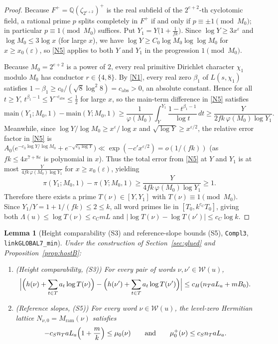 \documentclass[11pt]{amsart}
\newcommand{\Q}{\mathbb{Q}}
\newcommand{\eps}{\varepsilon}
\theoremstyle{plain}
\newtheorem{lemma}[theorem]{Lemma}
\theoremstyle{definition}
\numberwithin{equation}{section}
\begin{document}
\begin{proof}
Because $F^+=\Q(\zeta_{2^{e+2}})^+$ is the real subfield of the $2^{e+2}$-th cyclotomic field,
a rational prime $p$ splits completely in $F^+$ if and only if $p\equiv\pm 1\pmod{M_0}$; in
particular $p\equiv 1\pmod{M_0}$ suffices. Put $Y_1=Y\bigl(1+\frac{1}{fk}\bigr)$. Since
$\log Y\ge 3x^\eps$ and $\log M_0\le 3\log x$ (for large $x$), we have
$\log Y\ge C_0\log M_0\log\log M_0$ for $x\ge x_0(\eps)$, so \ref{N5} applies to both $Y$ and
$Y_1$ in the progression $1\pmod{M_0}$.

Because $M_0=2^{e+2}$ is a power of $2$, every real primitive Dirichlet character $\chi_1$
modulo $M_0$ has conductor $r\in\{4,8\}$. By \ref{N1}, every real zero $\beta_1$ of
$L(s,\chi_1)$ satisfies $1-\beta_1\ge c_0/(\sqrt{8}\log^2 8)=c_{\mathrm{abs}}>0$, an absolute
constant. Hence for all $t\ge Y$, $t^{\beta_1-1}\le Y^{-c_{\mathrm{abs}}}\le\frac12$ for large
$x$, so the main-term difference in \ref{N5} satisfies
\[
\mathrm{main}(Y_1;M_0,1)-\mathrm{main}(Y;M_0,1)
\ge\frac{1}{\varphi(M_0)}\int_Y^{Y_1}\frac{1-t^{\beta_1-1}}{\log t}\,dt
\ge\frac{Y}{2fk\,\varphi(M_0)\log Y_1}.
\]
Meanwhile, since $\log Y/\log M_0\ge x^\eps/\log x$ and $\sqrt{\log Y}\ge x^{\eps/2}$, the
relative error factor in \ref{N5} is
$A_0\bigl(e^{-c_3\log Y/\log M_0}+e^{-\sqrt{c_3\log Y}}\bigr)\ll\exp(-c' x^{\eps/2})=o(1/(fk))$
(as $fk\le 4x^{7+8\eps}$ is polynomial in $x$). Thus the total error from \ref{N5} at $Y$ and
$Y_1$ is at most $\frac{Y}{4fk\,\varphi(M_0)\log Y_1}$ for $x\ge x_0(\eps)$, yielding
\[
\pi(Y_1;M_0,1)-\pi(Y;M_0,1)\ge\frac{Y}{4fk\,\varphi(M_0)\log Y_1}\ge 1.
\]
Therefore there exists a prime $T(\nu)\in[Y,Y_1]$ with $T(\nu)\equiv 1\pmod{M_0}$. Since
$Y_1/Y=1+1/(fk)\le 2\le k$, all word primes lie in $[T_0,k^{c_C}T_0]$, giving both
$\Lambda(u)\le\log T(\nu)\le c_C mL$ and $|\log T(\nu)-\log T(\nu')|\le c_C\log k$.
\end{proof}

\begin{lemma}[Height comparability (S3) and reference-slope bounds (S5), \texttt{Compl3}, \texttt{linkGLOBAL7\_min}]\label{lem:S3S5}
Under the construction of Section~\ref{sec:glued} and Proposition~\ref{prop:hostB}:
\begin{enumerate}[label=(\roman*)]
\item \textup{(Height comparability, (S3))} For every pair of words $\nu,\nu'\in\mathcal W(u)$,
  \[
  \Bigl|\Bigl(h(\nu)+\sum_{t\in T}a_t\log T(\nu)\Bigr)-\Bigl(h(\nu')+\sum_{t\in T}a_t\log T(\nu')\Bigr)\Bigr|
  \le c_H(n_T a L_a + m B_0).
  \]
\item \textup{(Reference slopes, (S5))} For every word $\nu\in\mathcal W(u)$, the level-zero
  Hermitian lattice $N_{\nu,0}=M_{\mathrm{ram}}(\nu)$ satisfies
  \[
  -c_S n_T a L_a\Bigl(1+\frac{m}{k}\Bigr)\le\mu_0(\nu)\qquad\text{and}\qquad
  \mu_0^+(\nu)\le c_S n_T a L_a.
  \]
\end{enumerate}
\end{lemma}
\end{document}
